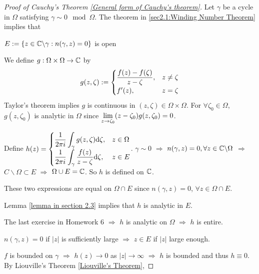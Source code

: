 \begin{proof}[Proof of Cauchy's Theorem \ref{General form of Cauchy's theorem}]
    Let  $ \gamma  $ be a cycle in  $ \Omega $ satisfying  $ \gamma\sim 0 \mod \Omega$. The theorem in \ref{sec2.1:Winding Number Theorem} implies that 
    \begin{center}
         $ E:=\{z\in \mathbb C\backslash\gamma:n(\gamma,z)=0\} $ is open 
    \end{center} 
    We define  $ g :\Omega\times\Omega\rightarrow \mathbb C$ by 
    \begin{equation}\label{sec4.3:g def}
        g(z,\zeta):=\begin{cases}
            \displaystyle\frac{f(z)-f(\zeta)}{z-\zeta},&z\neq \zeta \\
            f'(z),&z=\zeta
        \end{cases}
    \end{equation}  
    Taylor's theorem implies  $ g $ is continuous in  $ (z,\zeta)\in \Omega\times\Omega $. For  $ \forall \zeta_0\in \Omega $,  $ g(z,\zeta_0) $ is analytic in  $ \Omega $ since  $ \displaystyle\lim_{z\to\zeta_0}(z-\zeta_0)g(z,\zeta_0)=0$.
    
    Define  $ h(z)=\begin{cases}
        \displaystyle\frac{1}{2\pi i}\int_\gamma g(z,\zeta)\mathrm{d} \zeta,&z\in \Omega\\
        \displaystyle\frac{1}{2\pi i}\int_\gamma\frac{f(z)}{z-\zeta}\mathrm{d} \zeta,&z\in E
    \end{cases} $. 
     $ \gamma\sim 0 $ $ \Rightarrow  $  $ n(\gamma,z)=0,\forall z\in \mathbb C\backslash \Omega $ $ \Rightarrow  $ $ C\backslash \Omega\subset E $ $ \Rightarrow  $ $ \Omega\cup E=\mathbb C $. So  $ h $ is defined on  $ \mathbb C $.
     
     These two expressions are equal on  $ \Omega\cap E $ since  $ n(\gamma,z)=0 $, $ \forall z\in \Omega\cap E $.
     
    Lemma \ref{lemma in section 2.3} implies that  $ h $ is analytic in  $ E $.
    
    The last exercise in Homework 6 $ \Rightarrow $  $ h $  is analytic on  $ \Omega $ $ \Rightarrow $  $ h $ is entire.
    
     $ n(\gamma,z)=0 $ if  $ |z| $ is sufficiently large  $ \Rightarrow  $   $ z\in E $ if  $ |z| $ large enough.
     
      $ f $ is bounded on  $ \gamma $ $ \Rightarrow  $ $ h(z)\rightarrow 0 $ as  $ |z|\rightarrow\infty $ $ \Rightarrow $  $ h $ is bounded and thus  $ h\equiv 0 $. By Liouville's Theorem \ref{Liouville's Theorem}, 
      

\end{proof}
